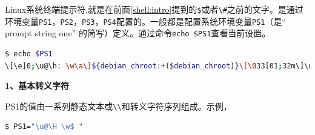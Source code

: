 \documentclass[doctor,openright,twoside]{sjtuthesis}
\newcommand{\passthrough}[1]{#1}
\theoremstyle{plain}
\theoremstyle{definition}
\theoremstyle{remark}
\theoremstyle{ocrenumbox}
\theoremstyle{plain}
\begin{document}
Linux系统终端提示符,就是在前面\ref{shell:intro}提到的\passthrough{\lstinline!$!}或者\passthrough{\lstinline!\#!}之前的文字。是通过环境变量\passthrough{\lstinline!PS1!}，\passthrough{\lstinline!PS2!}，\passthrough{\lstinline!PS3!}，\passthrough{\lstinline!PS4!}配置的。一般都是配置系统环境变量\passthrough{\lstinline!PS1!}（是`` prompt string one'' 的简写）定义。通过命令\passthrough{\lstinline!echo $PS1!}查看当前设置。

\begin{lstlisting}[language=bash]
$ echo $PS1
\[\e]0;\u@\h: \w\a\]${debian_chroot:+($debian_chroot)}\[\033[01;32m\]\u@\h\[\033[00m\]:\[\033[01;34m\]\w\[\033[00m\]$\setminus\$$
\end{lstlisting}

\textbf{1、基本转义字符}

PS1的值由一系列静态文本或\passthrough{\lstinline!\\!}和转义字符序列组成。示例，

\begin{lstlisting}[language=bash]
$ PS1="\u@\H \w$ "
\end{lstlisting}
\end{document}

